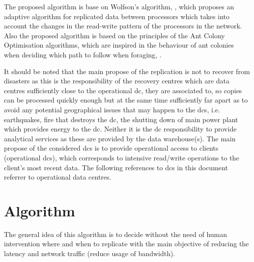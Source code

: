 \documentclass[english]{article}
\begin{document}
	The proposed algorithm is base on Wolfson's algorithm, \cite{Wolfson1990a}, which proposes an adaptive algorithm for replicated data between processors which takes into account the changes in the read-write pattern of the processors in the network. Also the proposed algorithm is based on the principles of the Ant Colony Optimisation algorithms, which are inspired in the behaviour of ant colonies when deciding which path to follow when foraging, \cite{dorigo1992a}.
	
	It should be noted that the main propose of the replication is not to recover from disasters as this is the responsibility of the recovery centres which are data centres sufficiently close to the operational \gls{dc}, they are associated to, so copies can be processed quickly enough but at the same time sufficiently far apart as to avoid any potential geographical issues that may happen to the \glspl{dc}, i.e. earthquakes, fire that destroys the \gls{dc}, the shutting down of main power plant which provides energy to the \gls{dc}. Neither it is the \gls{dc} responsibility to provide analytical services as these are provided by the data warehouse(s). The main propose of the considered \glspl{dc} is to provide operational access to clients (operational \glspl{dc}), which corresponds to intensive read/write operations to the client's most recent data. The following references to \glspl{dc} in this document referrer to operational data centres.


\section{Algorithm}
The general idea of this algorithm is to decide without the need of human intervention where and when to replicate with the main objective of reducing the latency and network traffic (reduce usage of bandwidth).
\end{document}
